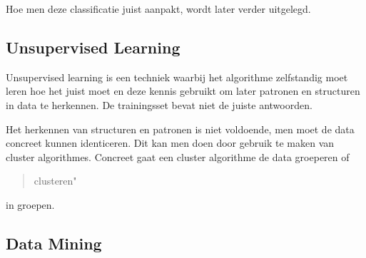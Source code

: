 Hoe men deze classificatie juist aanpakt, wordt later verder uitgelegd.

\subsection{Unsupervised Learning}\label{Unsupervised Learning}

Unsupervised learning is een techniek waarbij het algorithme zelfstandig moet leren hoe het juist moet en deze kennis gebruikt om later patronen en structuren in data te herkennen. De trainingsset bevat niet de juiste antwoorden.

Het herkennen van structuren en patronen is niet voldoende, men moet de data concreet kunnen identiceren. Dit kan men doen door gebruik te maken van cluster algorithmes. Concreet gaat een cluster algorithme de data groeperen of \begin{quote}clusteren"\end{quote} in groepen.


\subsection{Data Mining}\label{Data Mining}

